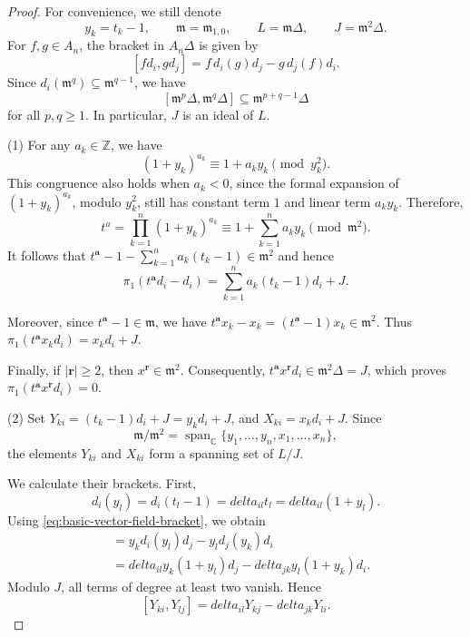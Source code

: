 \documentclass[12pt,a4paper]{amsart}
\def\delta{delta}%
\numberwithin{equation}{section}
\def\ba{\mathbf{a}}
\def\br{\mathbf{r}}
\begin{document}
\begin{proof}
For convenience, we still denote
\[
y_k=t_k-1,
\qquad
\mathfrak m=\mathfrak m_{1,0},
\qquad
L=\mathfrak m\Delta,
\qquad
J=\mathfrak m^2\Delta.
\]
For \(f,g\in A_n\), the bracket in \(A_n\Delta\) is given by
\begin{equation}\label{eq:basic-vector-field-bracket}
[fd_i,gd_j]
 =
 f\,d_i(g)d_j-g\,d_j(f)d_i.
\end{equation}
Since $
d_i(\mathfrak m^q)\subseteq \mathfrak m^{q-1}$,
we have
\begin{equation}\label{eq:filtration-bracket}
[\mathfrak m^p\Delta,\mathfrak m^q\Delta]
\subseteq
\mathfrak m^{p+q-1}\Delta
\end{equation}
for all \(p,q\geq 1\). In particular, \(J\) is an ideal of \(L\).

\smallskip

(1)
For any \(a_k\in\mathbb Z\), we have
\[
(1+y_k)^{a_k}\equiv 1+a_ky_k\pmod{y_k^2}.
\]
This congruence also holds when \(a_k<0\), since the formal expansion
of \((1+y_k)^{a_k}\), modulo \(y_k^2\), still has constant term \(1\)
and linear term \(a_ky_k\). Therefore,
\[
t^a
 =
 \prod_{k=1}^{n}(1+y_k)^{a_k}
 \equiv
 1+\sum_{k=1}^{n}a_ky_k
 \pmod{\mathfrak m^2}.
\]
It follows that $
t^\ba-1-\sum_{k=1}^{n}a_k(t_k-1)\in\mathfrak m^2$
and hence $$
\pi_1(t^\ba d_i-d_i)
 =
 \sum_{k=1}^{n}a_k(t_k-1)d_i+J.$$


Moreover, since \(t^\ba-1\in\mathfrak m\), we have
\(
t^\ba x_k-x_k=(t^\ba-1)x_k\in\mathfrak m^2
\).
Thus $
\pi_1(t^\ba x_kd_i)=x_kd_i+J$.

Finally, if \(|\br|\geq2\), then \(x^\br\in\mathfrak m^2\).
Consequently, $
t^\ba x^\br d_i\in\mathfrak m^2\Delta=J$,
which proves
$
\pi_1(t^\ba x^\br d_i)=0$.


\smallskip

(2)
Set
$
Y_{ki}=(t_k-1)d_i+J=y_kd_i+J$,
and $
X_{ki}=x_kd_i+J$.
Since $$
\mathfrak m/\mathfrak m^2
 =
 \operatorname{span}_{\mathbb C}
 \{y_1,\ldots,y_n,x_1,\ldots,x_n\},$$
the elements \(Y_{ki}\) and \(X_{ki}\) form a spanning set of \(L/J\).

We calculate their brackets. First,
\[
d_i(y_l)=d_i(t_l-1)=\delta_{il}t_l
=\delta_{il}(1+y_l).
\]
Using \eqref{eq:basic-vector-field-bracket}, we obtain
\begin{align*}
[y_kd_i,y_ld_j]
&=
y_kd_i(y_l)d_j-y_ld_j(y_k)d_i\\
&=
\delta_{il}y_k(1+y_l)d_j
-
\delta_{jk}y_l(1+y_k)d_i.
\end{align*}
Modulo \(J\), all terms of degree at least two vanish. Hence
\begin{equation}\label{eq:YY-bracket}
[Y_{ki},Y_{lj}]
 =
 \delta_{il}Y_{kj}-\delta_{jk}Y_{li}.
\end{equation}


\end{proof}
\end{document}
